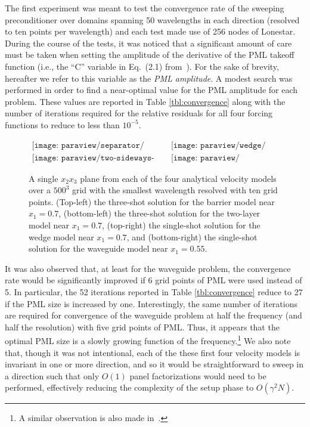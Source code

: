 The first experiment was meant to test the convergence rate of the sweeping 
preconditioner over domains spanning 50 wavelengths in each direction
(resolved to ten points per wavelength) and each test made use of 256 nodes of 
Lonestar. During the course of the tests, it was noticed that a significant 
amount of care must be taken when setting the amplitude of the derivative of 
the PML takeoff function (i.e., the ``C'' variable in Eq.~(2.1) 
from~\cite{EngquistYing-PML}). For the sake of brevity, hereafter we refer to
this variable as the {\em PML amplitude}. A modest search was performed in
order to find a near-optimal value for the PML amplitude for each problem.
These values are reported in Table \ref{tbl:convergence} along with the number 
of iterations required for the relative residuals for all four forcing functions
to reduce to less than $10^{-5}$.



\begin{figure}
$
\begin{array}{cc}
\texttt{[image: paraview/separator/threeShots07-trim.pdf]} &
\texttt{[image: paraview/wedge/oneShot07-trim.pdf]} \\
\texttt{[image: paraview/two-sideways-layers/threeShots07-trim.pdf]} &
\texttt{[image: paraview/waveguide/oneShot055-trim.pdf]}
\end{array}
$
\caption{A single $x_2 x_3$ plane from each of the four analytical velocity 
models over a $500^3$ grid with the smallest wavelength resolved with ten grid 
points.
(Top-left) the three-shot solution for the barrier model near $x_1=0.7$, 
(bottom-left) the three-shot solution for the two-layer model near $x_1=0.7$, 
(top-right) the single-shot solution for the wedge model near $x_1=0.7$, and
(bottom-right) the single-shot solution for the waveguide model near 
$x_1=0.55$.}
\end{figure}

It was also observed that, at least for the waveguide problem, 
the convergence rate would be significantly improved if 6 grid points of PML 
were used instead of 5. 
In particular, the 52 iterations reported in Table \ref{tbl:convergence} reduce 
to 27 if the PML size is increased by one. 
Interestingly, the same number of iterations
are required for convergence of the waveguide problem at half the frequency 
(and half the resolution) with five grid points of PML. Thus, it appears that 
the optimal PML size is a slowly growing function of the 
frequency.\footnote{A similar observation is also made 
in~\cite{Stolk-sweeping}.}
We also note that, though it was not intentional, each of the these first four 
velocity
models is invariant in one or more direction, and so it would be straightforward
to sweep in a direction such that only $O(1)$ panel factorizations would need
to be performed, effectively reducing the complexity of the setup phase to 
$O(\gamma^2 N)$.

